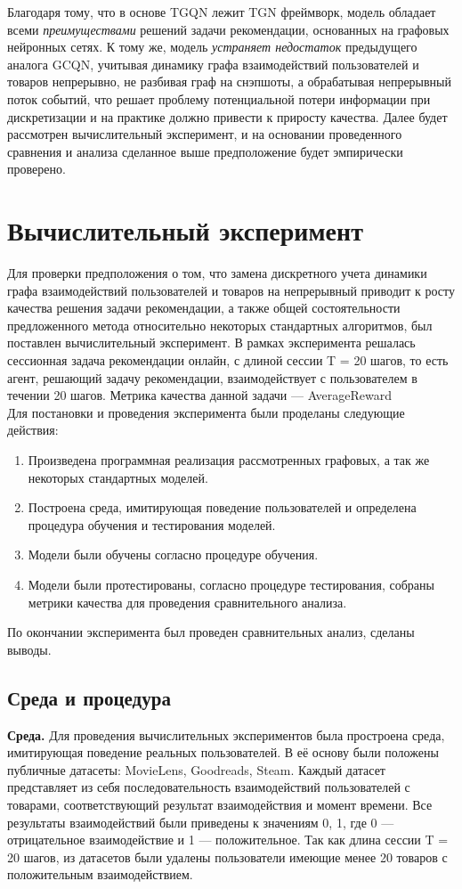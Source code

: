\documentclass{mipt-thesis-ms}
\begin{document}
Благодаря тому, что в основе TGQN лежит TGN фреймворк, модель обладает всеми {\it преимуществами} решений задачи рекомендации, основанных на графовых нейронных сетях. К тому же, модель {\it устраняет недостаток} предыдущего аналога GCQN, учитывая динамику графа взаимодействий пользователей и товаров непрерывно, не разбивая граф на снэпшоты, а обрабатывая непрерывный поток событий, что решает проблему потенциальной потери информации при дискретизации и на практике должно привести к приросту качества. Далее будет рассмотрен вычислительный эксперимент, и на основании проведенного сравнения и анализа сделанное выше предположение будет эмпирически проверено.

\chapter{Вычислительный эксперимент}
Для проверки предположения о том, что замена дискретного учета динамики графа взаимодействий пользователей и товаров на непрерывный приводит к росту качества решения задачи рекомендации, а также общей состоятельности предложенного метода относительно некоторых стандартных алгоритмов, был поставлен вычислительный эксперимент. В рамках эксперимента решалась сессионная задача рекомендации онлайн, с длиной сессии T = 20 шагов, то есть агент, решающий задачу рекомендации, взаимодействует с пользователем в течении 20 шагов. Метрика качества данной задачи --- AverageReward\\

Для постановки и проведения эксперимента были проделаны следующие действия:
\begin{enumerate}
\item Произведена программная реализация рассмотренных графовых, а так же некоторых стандартных моделей.
\item Построена среда, имитирующая поведение пользователей и определена процедура обучения и тестирования моделей.
\item Модели были обучены согласно процедуре обучения.
\item Модели были протестированы, согласно процедуре тестирования, собраны метрики качества для проведения сравнительного анализа.
\end{enumerate}

По окончании эксперимента был проведен сравнительных анализ, сделаны выводы.

\section{Среда и процедура}
{\bf Среда.} Для проведения вычислительных экспериментов была простроена среда, имитирующая поведение реальных пользователей. В её основу были положены публичные датасеты: MovieLens, Goodreads, Steam. Каждый датасет представляет из себя последовательность взаимодействий пользователей с товарами, соответствующий результат взаимодействия и момент времени. Все результаты взаимодействий были приведены к значениям {0, 1}, где 0 --- отрицательное взаимодействие и 1 --- положительное. Так как длина сессии T = 20 шагов, из датасетов были удалены пользователи имеющие менее 20 товаров с положительным взаимодействием.\\
\end{document}
